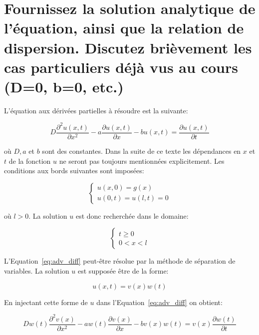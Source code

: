 \documentclass[a4paper, 12pt]{report}
\begin{document}
\section{Fournissez la solution analytique de l'équation, ainsi que la relation
de dispersion. Discutez brièvement les cas particuliers déjà vus au cours (D=0, b=0, etc.)}

L'équation aux dérivées partielles à résoudre est la suivante:

\begin{equation}
D \frac{\partial^2 u(x,t)}{\partial x^2} - a \frac{\partial u(x,t)}{\partial x} - b u(x,t) = \frac{\partial u(x,t)}{\partial t}
\label{eq:adv_diff}
\end{equation}

où $D, a$ et $b$ sont des constantes. Dans la suite de ce texte les dépendances en $x$ et $t$
de la fonction $u$ ne seront pas toujours mentionnées explicitement. Les conditions
aux bords suivantes sont imposées:

\begin{equation}
  \left \{
  \begin{aligned}
    u(x,0) = g(x)\\
    u(0,t) = u(l,t) = 0
  \end{aligned}
  \right.
\end{equation}

où $l > 0$. La solution $u$ est donc recherchée dans le domaine:

\begin{equation}
  \left \{
  \begin{aligned}
    t \ge 0\\
    0 < x < l
  \end{aligned}
  \right.
\end{equation}

L'Equation~\ref{eq:adv_diff} peut-être résolue par la méthode de séparation de
variables. La solution $u$ est supposée être de la forme:

\begin{equation}
  u(x,t) = v(x) w(t)
\end{equation}

En injectant cette forme de $u$ dans l'Equation~\ref{eq:adv_diff} on obtient:

\begin{equation}
D w(t) \frac{\partial^2 v(x)}{\partial x^2} - a w(t) \frac{\partial v(x)}{\partial x} - b v(x) w(t) = v(x) \frac{\partial w(t)}{\partial t}
\end{equation}
\end{document}
